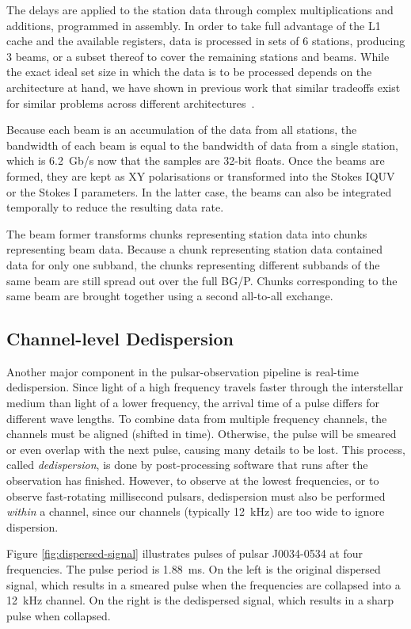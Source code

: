 \documentclass{llncs}
\begin{document}
The delays are applied to the station data through complex multiplications and additions, programmed in assembly. In order to take full advantage of the L1 cache and the available registers, data is processed in sets of 6 stations, producing 3 beams, or a subset thereof to cover the remaining stations and beams. While the exact ideal set size in which the data is to be processed depends on the architecture at hand, we have shown in previous work that similar tradeoffs exist for similar problems across different architectures~\cite{Nieuwpoort:09,BAR}.

Because each beam is an accumulation of the data from all stations, the bandwidth of each beam is equal to the bandwidth of data from a single station, which is 6.2~Gb/s now that the samples are 32-bit floats. Once the beams are formed, they are kept as XY polarisations or transformed into the Stokes IQUV or the Stokes I parameters. In the latter case, the beams can also be integrated temporally to reduce the resulting data rate.

The beam former transforms chunks representing station data into chunks representing beam data. Because a chunk representing station data contained data for only one subband, the chunks representing different subbands of the same beam are still spread out over the full BG/P. Chunks corresponding to the same beam are brought together using a second all-to-all exchange.

\subsection{Channel-level Dedispersion}

Another major component in the pulsar-observation pipeline is real-time dedispersion.  Since light of a high frequency travels faster through the interstellar medium than light of a lower frequency, the arrival time of a pulse differs for different wave lengths. To combine data from multiple frequency channels, the channels must be aligned (shifted in time). Otherwise, the pulse will be smeared or even overlap with the next pulse, causing many details to be lost. This process, called \emph{dedispersion}, is done by post-processing software that runs after the observation has finished.  However, to observe at the lowest frequencies, or to observe fast-rotating millisecond pulsars, dedispersion must also be performed \emph{within\/} a channel, since our channels (typically 12~kHz) are too wide to ignore dispersion.

Figure \ref{fig:dispersed-signal} illustrates pulses of pulsar J0034-0534 at four frequencies. The pulse period is 1.88~ms. On the left is the original dispersed signal, which results in a smeared pulse when the frequencies are collapsed into a 12~kHz channel. On the right is the dedispersed signal, which results in a sharp pulse when collapsed.
\end{document}
